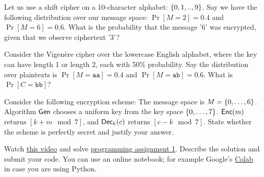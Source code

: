 \documentclass[a4paper,10pt]{article}
\begin{document}
\begin{question}{1}
Let us use a shift cipher on a 10-character alphabet: $\{0,1,..,9\}$. Say we have the following distribution over our message space:
$\Pr[M=2]=0.4$ and $\Pr[M=6]=0.6$. What is the probability that the message '6' was encrypted, given that we observe ciphertext '3'?
\end{question}

\begin{solution}
\end{solution}


\begin{question}{1}
Consider the Vigenère cipher over the lowercase English alphabet, where the key can have length 1 or length 2, each with 50\% probability. Say the distribution over plaintexts is $\Pr[M=\mathtt{aa}]=0.4$ and $\Pr[M=\mathtt{ab}]=0.6$. What is $\Pr[C=\mathtt{bb}]$?
\end{question}

\begin{solution}
\end{solution}

\begin{question}{2}
 Consider the following encryption scheme: The message space is $M=\{0,\ldots,6\}$. Algorithm $\mathsf{Gen}$ chooses a uniform key from the key space $\{0, \ldots,7\}$. $\mathsf{Enc}(m)$ returns $[k+m \mod 7]$, and $\mathsf{Dec}_k(c)$ returns $[c-k \mod 7]$. State whether the scheme is perfectly secret and justify your answer.
\end{question}

\begin{solution}
\end{solution}


\begin{programming}{5}
Watch \href{https://www.coursera.org/learn/cryptography/lecture/01t8O/breaking-the-vigenere-cipher}{this video} and solve \href{https://www.coursera.org/learn/cryptography/supplement/7mgaE/programming-assignment-1}{programming assignment 1}. Describe the solution and submit your code. You can use an online notebook; for example Google's \href{https://colab.research.google.com}{Colab} in case you are using Python.
\end{programming}

\begin{solution}
\end{solution}
\end{document}
